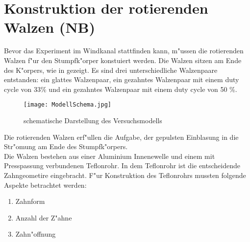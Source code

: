 \chapter{Konstruktion der rotierenden Walzen (NB)}
\label{s:rotierendeWalzen}
Bevor das Experiment im Windkanal stattfinden kann, m"ussen die rotierenden Walzen f"ur den Stumpfk"orper konstuiert werden. Die Walzen sitzen am Ende des K"orpers, wie in  gezeigt. Es sind drei unterschiedliche Walzenpaare entstanden: ein glattes Walzenpaar, ein gezahntes Walzenpaar mit einem duty cycle von 33\% und ein gezahntes Walzenpaar mit einem duty cycle von 50 \%.\\

\begin{figure}[h]
	\centering
	\texttt{[image: ModellSchema.jpg]}
	\caption{schematische Darstellung des Versuchsmodells}
	\label{fig:modelschema}
\end{figure}
Die rotierenden Walzen erf"ullen die Aufgabe, der gepulsten Einblasung in die Str"omung am Ende des Stumpfk"orpers.\\
Die Walzen bestehen aus einer Aluminium Innenewelle und einem mit Presspassung verbundenen Teflonrohr. In dem Teflonrohr ist die entscheidende Zahngeometire eingebracht. F"ur Konstruktion des Teflonrohrs mussten folgende Aspekte betrachtet werden:
\begin{enumerate}
	\item Zahnform 
	\item Anzahl der Z"ahne
	\item Zahn"offnung 
\end{enumerate}

